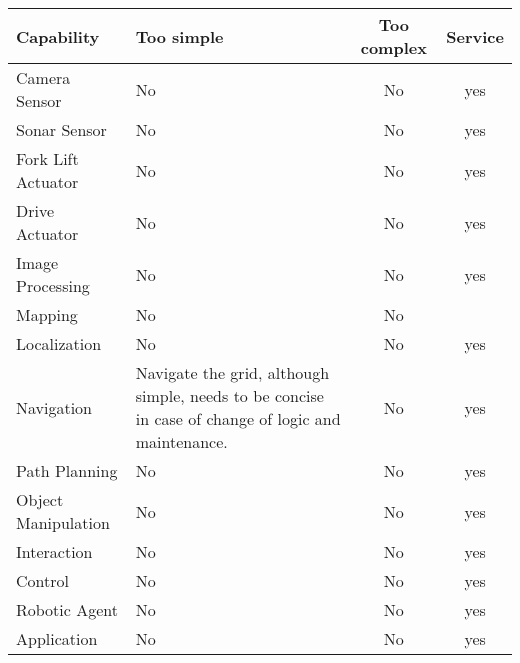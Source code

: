 {
\centering
\begin{tabular}{| l | p{6.6cm} | c | c |}
	\hline
	Capability & Too simple & Too complex & Service\\
	\hline
	Camera Sensor & No & No & yes\\
	Sonar Sensor & No & No & yes\\
	Fork Lift Actuator & No & No & yes\\
	Drive Actuator & No & No & yes\\
	\hline
	Image Processing & No & No & yes\\
	Mapping & No & No &\\
	Localization & No & No & yes\\ %
	Navigation & Navigate the grid, although simple, needs to be concise in case of change of logic and maintenance. & No & yes\\
	Path Planning & No & No & yes\\
	Object Manipulation & No & No & yes\\
	Interaction & No & No & yes\\
	Control & No & No & yes\\
	Robotic Agent & No & No & yes\\
	Application & No & No & yes\\
	\hline
\end{tabular}
}

